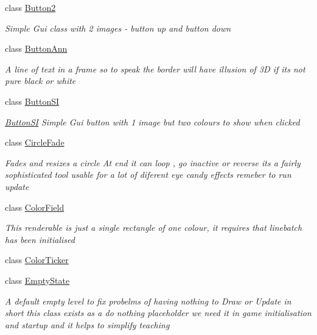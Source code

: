 \begin{DoxyCompactItemize}
class \mbox{\hyperlink{class_r_c___framework_1_1_button2}{Button2}}
\begin{DoxyCompactList}\small\item\em Simple Gui class with 2 images -\/ button up and button down \end{DoxyCompactList}\item 
class \mbox{\hyperlink{class_r_c___framework_1_1_button_ann}{Button\+Ann}}
\begin{DoxyCompactList}\small\item\em A line of text in a frame so to speak the border will have illusion of 3D if its not pure black or white \end{DoxyCompactList}\item 
class \mbox{\hyperlink{class_r_c___framework_1_1_button_s_i}{Button\+SI}}
\begin{DoxyCompactList}\small\item\em \mbox{\hyperlink{class_r_c___framework_1_1_button_s_i}{Button\+SI}} Simple Gui button with 1 image but two colours to show when clicked \end{DoxyCompactList}\item 
class \mbox{\hyperlink{class_r_c___framework_1_1_circle_fade}{Circle\+Fade}}
\begin{DoxyCompactList}\small\item\em Fades and resizes a circle At end it can loop , go inactive or reverse its a fairly sophisticated tool usable for a lot of diferent eye candy effects remeber to run update \end{DoxyCompactList}\item 
class \mbox{\hyperlink{class_r_c___framework_1_1_color_field}{Color\+Field}}
\begin{DoxyCompactList}\small\item\em This renderable is just a single rectangle of one colour, it requires that linebatch has been initialised \end{DoxyCompactList}\item 
class \mbox{\hyperlink{class_r_c___framework_1_1_color_ticker}{Color\+Ticker}}
\item 
class \mbox{\hyperlink{class_r_c___framework_1_1_empty_state}{Empty\+State}}
\begin{DoxyCompactList}\small\item\em A default \textquotesingle{}empty\textquotesingle{} level to fix probelms of having nothing to Draw or Update in short this class exists as a do nothing placeholder we need it in game initialisation and startup and it helps to simplify teaching \end{DoxyCompactList}\item 

\end{DoxyCompactItemize}
